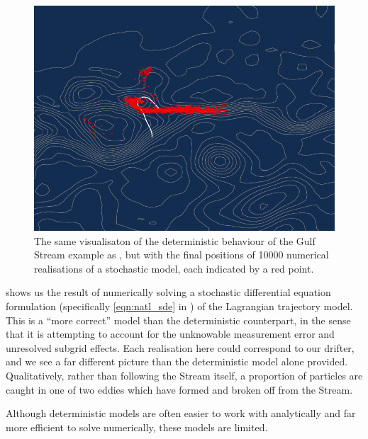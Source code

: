 \begin{figure}
	\begin{center}
		\includegraphics[width=\textwidth]{figures/gulf_stream_motivation/num_rels.pdf}
		\caption{The same visualisaton of the deterministic behaviour of the Gulf Stream example as , but with the final positions of 10000 numerical realisations of a stochastic model, each indicated by a red point.}
		\label{fig:na_motiv_rels}
	\end{center}
\end{figure}



 shows us the result of numerically solving a stochastic differential equation formulation (specifically \eqref{eqn:natl_sde} in ) of the Lagrangian trajectory model.
This is a ``more correct'' model than the deterministic counterpart, in the sense that it is attempting to account for the unknowable measurement error and unresolved subgrid effects.
Each realisation here could correspond to our drifter, and we see a far different picture than the deterministic model alone provided.
Qualitatively, rather than following the Stream itself, a proportion of particles are caught in one of two eddies which have formed and broken off from the Stream.



Although deterministic models are often easier to work with analytically and far more efficient to solve numerically, these models are limited.






